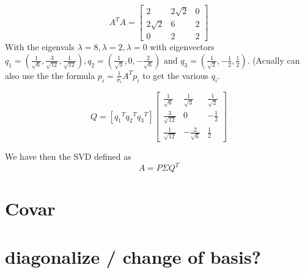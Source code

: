 \documentclass[a4paper]{article}
\begin{document}
$$
A^{T} A=\left[\begin{array}{ccc}{2} & {2 \sqrt{2}} & {0} \\ {2 \sqrt{2}} & {6} & {2} \\ {0} & {2} & {2}\end{array}\right]
$$
With the eigenvals $\lambda=8, \lambda=2, \lambda=0$ with eigenvectors
$q_{1}=\left(\frac{1}{\sqrt{6}}, \frac{3}{\sqrt{12}}, \frac{1}{\sqrt{12}}\right), q_{2}=\left(\frac{1}{\sqrt{3}}, 0,-\frac{2}{\sqrt{6}}\right) \text { and } q_{3}=\left(\frac{1}{\sqrt{2}},-\frac{1}{2}, \frac{1}{2}\right)$. (Acually
 can also use the the formula $p_{i}=\frac{1}{\sigma_{i}} A^{T} p_{i}$ to get the various $q_i$.


$$
Q=\left[  {q_1}^T {q_2}^T {q_3}^T     \right]
\left[\begin{array}{ccc}{\frac{1}{\sqrt{6}}} & {\frac{1}{\sqrt{3}}} & {\frac{1}{\sqrt{2}}} \\ {\frac{3}{\sqrt{12}}} & {0} & {-\frac{1}{2}} \\ {\frac{1}{\sqrt{12}}} & {-\frac{2}{\sqrt{6}}} & {\frac{1}{2}}\end{array}\right]
$$


We have then the SVD defined as
$$
A=P \Sigma Q^{T}
$$

\section{Covar}
\label{sec-4}


\newpage

\section{diagonalize / change of basis?}
\label{sec-5}
\end{document}
